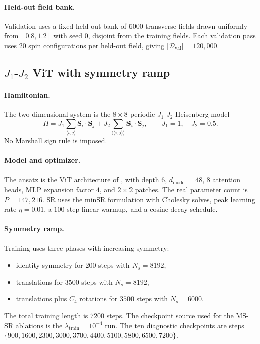 \paragraph{Held-out field bank.}
Validation uses a fixed held-out bank of $6000$ transverse fields drawn
uniformly from $[0.8,1.2]$ with seed $0$, disjoint from the training fields.
Each validation pass uses $20$ spin configurations per held-out field, giving
$|\mathcal D_{\mathrm{val}}|=120{,}000$.

\subsection[J1-J2 ViT with symmetry ramp]{$J_1$-$J_2$ ViT with symmetry ramp}

\paragraph{Hamiltonian.}
The two-dimensional system is the $8\times8$ periodic $J_1$-$J_2$ Heisenberg
model
\[
    H
    =
    J_1\sum_{\langle i,j\rangle}\mathbf S_i\cdot\mathbf S_j
    +
    J_2\sum_{\langle\!\langle i,j\rangle\!\rangle}
    \mathbf S_i\cdot\mathbf S_j,
    \qquad
    J_1=1,\quad J_2=0.5 .
\]
No Marshall sign rule is imposed.

\paragraph{Model and optimizer.}
The ansatz is the ViT architecture of \citet{rende2024simple}, with depth $6$,
$d_{\mathrm{model}}=48$, $8$ attention heads, MLP expansion factor $4$, and
$2\times2$ patches. The real parameter count is $P=147{,}216$. SR uses the
minSR formulation with Cholesky solves, peak learning rate $\eta=0.01$, a
$100$-step linear warmup, and a cosine decay schedule.

\paragraph{Symmetry ramp.}
Training uses three phases with increasing symmetry:
\begin{itemize}
    \item identity symmetry for $200$ steps with $N_s=8192$,
    \item translations for $3500$ steps with $N_s=8192$,
    \item translations plus $C_4$ rotations for $3500$ steps with $N_s=6000$.
\end{itemize}
The total training length is $7200$ steps. The checkpoint source used for the
MS-SR ablations is the $\lambda_{\mathrm{train}}=10^{-4}$ run. The ten
diagnostic checkpoints are steps
$\{900,1600,2300,3000,3700,4400,5100,5800,6500,7200\}$.

